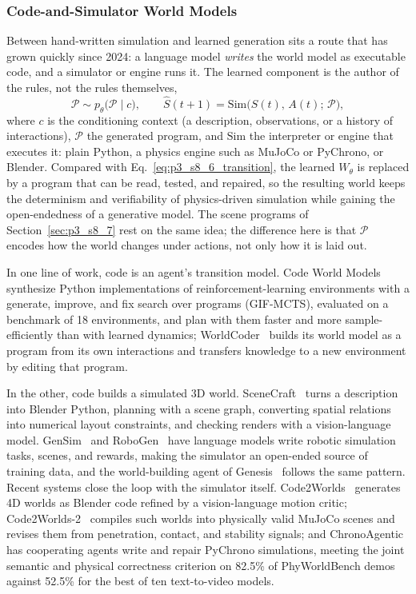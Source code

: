 \subsubsection{Code-and-Simulator World Models}
\label{subsubsec:p3_s8_6_code}
Between hand-written simulation and learned generation sits a route that has grown quickly since 2024: a language model \emph{writes} the world model as executable code, and a simulator or engine runs it. The learned component is the author of the rules, not the rules themselves,
\begin{equation}
\label{eq:p3_s8_6_code}
\mathcal{P} \sim p_\theta\big(\mathcal{P} \mid c\big), \qquad \hat{S}(t+1) = \mathrm{Sim}\big(S(t),\, A(t);\, \mathcal{P}\big),
\end{equation}
where $c$ is the conditioning context (a description, observations, or a history of interactions), $\mathcal{P}$ the generated program, and $\mathrm{Sim}$ the interpreter or engine that executes it: plain Python, a physics engine such as MuJoCo or PyChrono, or Blender. Compared with Eq.~\eqref{eq:p3_s8_6_transition}, the learned $W_\theta$ is replaced by a program that can be read, tested, and repaired, so the resulting world keeps the determinism and verifiability of physics-driven simulation while gaining the open-endedness of a generative model. The scene programs of Section~\ref{sec:p3_s8_7} rest on the same idea; the difference here is that $\mathcal{P}$ encodes how the world changes under actions, not only how it is laid out.

In one line of work, code is an agent's transition model. Code World Models~\cite{dainese2024codeworld} synthesize Python implementations of reinforcement-learning environments with a generate, improve, and fix search over programs (GIF-MCTS), evaluated on a benchmark of 18 environments, and plan with them faster and more sample-efficiently than with learned dynamics; WorldCoder~\cite{tang2024worldcoder} builds its world model as a program from its own interactions and transfers knowledge to a new environment by editing that program.

In the other, code builds a simulated 3D world. SceneCraft~\cite{hu2024scenecraft} turns a description into Blender Python, planning with a scene graph, converting spatial relations into numerical layout constraints, and checking renders with a vision-language model. GenSim~\cite{wang2023gensim} and RoboGen~\cite{wang2023robogen} have language models write robotic simulation tasks, scenes, and rewards, making the simulator an open-ended source of training data, and the world-building agent of Genesis~\cite{Genesis} follows the same pattern. Recent systems close the loop with the simulator itself. 
Code2Worlds~\cite{zhang2026code2worlds} generates 4D worlds as Blender code refined by a vision-language motion critic; Code2Worlds-2~\cite{zhang2026code2worlds2} compiles such worlds into physically valid MuJoCo scenes and revises them from penetration, contact, and stability signals; and ChronoAgentic~\cite{wang2026chronoagentic} has cooperating agents write and repair PyChrono simulations, meeting the joint semantic and physical correctness criterion on 82.5\% of PhyWorldBench demos against 52.5\% for the best of ten text-to-video models.

